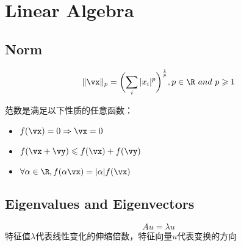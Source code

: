 \chapter{Linear Algebra}

\section{Norm}
\[
    \|\vx\|_p = \biggl(\sum_i |x_i|^p\biggr)^{\frac{1}{p}}, p \in \R\ and\ p \geqslant 1
\]

范数是满足以下性质的任意函数：
\begin{itemize}
    \item $f(\vx) = 0 \Rightarrow \vx = 0$
    \item $f(\vx + \vy) \leqslant f(\vx) + f(\vy)$
    \item $\forall \alpha \in \R, f(\alpha \vx) = |\alpha|f(\vx)$
\end{itemize}

\section{Eigenvalues and Eigenvectors}
\begin{equation}
    Au = \lambda u
\end{equation}
特征值$\lambda$代表线性变化的伸缩倍数，特征向量$u$代表变换的方向

